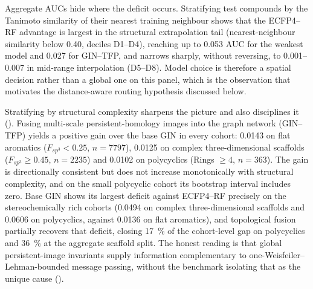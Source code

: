 Aggregate AUCs hide where the deficit occurs. Stratifying test compounds by the Tanimoto similarity of their nearest training neighbour shows that the ECFP4--RF advantage is largest in the structural extrapolation tail (nearest-neighbour similarity below \num{0.40}, deciles D1--D4), reaching up to \num{0.053} AUC for the weakest model and \num{0.027} for GIN--TFP, and narrows sharply, without reversing, to \num{0.001}--\num{0.007} in mid-range interpolation (D5--D8). Model choice is therefore a spatial decision rather than a global one on this panel, which is the observation that motivates the distance-aware routing hypothesis discussed below.

Stratifying by structural complexity sharpens the picture and also disciplines it (). Fusing multi-scale persistent-homology images into the graph network (GIN--TFP) yields a positive gain over the base GIN in every cohort: \num{+0.0143} on flat aromatics ($F_{sp^3} < \num{0.25}$, $n = \num{7797}$), \num{+0.0125} on complex three-dimensional scaffolds ($F_{sp^3} \geq \num{0.45}$, $n = \num{2235}$) and \num{+0.0102} on polycyclics (Rings $\geq \num{4}$, $n = \num{363}$). The gain is directionally consistent but does not increase monotonically with structural complexity, and on the small polycyclic cohort its bootstrap interval includes zero. Base GIN shows its largest deficit against ECFP4--RF precisely on the stereochemically rich cohorts (\num{0.0494} on complex three-dimensional scaffolds and \num{0.0606} on polycyclics, against \num{0.0136} on flat aromatics), and topological fusion partially recovers that deficit, closing \qty{17}{\percent} of the cohort-level gap on polycyclics and \qty{36}{\percent} at the aggregate scaffold split. The honest reading is that global persistent-image invariants supply information complementary to one-Weisfeiler--Lehman-bounded message passing, without the benchmark isolating that as the unique cause ().

